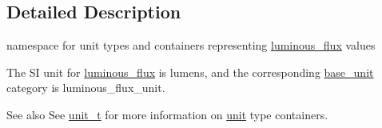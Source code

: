 \subsection{Detailed Description}
namespace for unit types and containers representing \hyperlink{namespaceunits_1_1luminous__flux}{luminous\+\_\+flux} values 

The S\+I unit for \hyperlink{namespaceunits_1_1luminous__flux}{luminous\+\_\+flux} is {\ttfamily lumens}, and the corresponding {\ttfamily \hyperlink{structunits_1_1base__unit}{base\+\_\+unit}} category is {\ttfamily luminous\+\_\+flux\+\_\+unit}. \begin{DoxySeeAlso}{See also}
See \hyperlink{classunits_1_1unit__t}{unit\+\_\+t} for more information on \hyperlink{structunits_1_1unit}{unit} type containers. 
\end{DoxySeeAlso}
